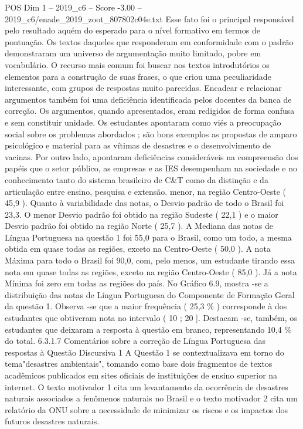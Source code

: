 \begin{textsample}{POS Dim 1 – 2019\_c6 – Score -3.00 – 2019\_c6/enade\_2019\_zoot\_807802c04e.txt}
Esse fato foi o principal responsável pelo resultado aquém do esperado para o nível formativo em termos de pontuação.
Os textos daqueles que responderam em conformidade com o padrão demonstraram um universo de argumentação muito limitado, pobre em vocabulário.
O recurso mais comum foi buscar nos textos introdutórios os elementos para a construção de suas frases, o que criou uma peculiaridade interessante, com grupos de respostas muito parecidas.
Encadear e relacionar argumentos também foi uma deficiência identificada pelos docentes da banca de correção.
Os argumentos, quando apresentados, eram redigidos de forma confusa e sem constituir unidade.
Os estudantes apontaram como viés a preocupação social sobre os problemas abordados ; são bons exemplos as propostas de amparo psicológico e material para as vítimas de desastres e o desenvolvimento de vacinas.
Por outro lado, apontaram deficiências consideráveis na compreensão dos papéis que o setor público, as empresas e as IES desempenham na sociedade e no conhecimento tanto do sistema brasileiro de C\&T como da distinção e da articulação entre ensino, pesquisa e extensão. menor, na região Centro-Oeste ( 45,9 ).
Quanto à variabilidade das notas, o Desvio padrão de todo o Brasil foi 23,3.
O menor Desvio padrão foi obtido na região Sudeste ( 22,1 ) e o maior Desvio padrão foi obtido na região Norte ( 25,7 ).
A Mediana das notas de Língua Portuguesa na questão 1 foi 55,0 para o Brasil, como um todo, a mesma obtida em quase todas as regiões, exceto na Centro-Oeste ( 50,0 ).
A nota Máxima para todo o Brasil foi 90,0, com, pelo menos, um estudante tirando essa nota em quase todas as regiões, exceto na região Centro-Oeste ( 85,0 ).
Já a nota Mínima foi zero em todas as regiões do país.
No Gráfico 6.9, mostra -se a distribuição das notas de Língua Portuguesa do Componente de Formação Geral da questão 1.
Observa -se que a maior frequência ( 25,3 \% ) corresponde à dos estudantes que obtiveram nota no intervalo ( 10 ; 20 ].
Destacam -se, também, os estudantes que deixaram a resposta à questão em branco, representando 10,4 \% do total. 6.3.1.7 Comentários sobre a correção de Língua Portuguesa das respostas à Questão Discursiva 1 A Questão 1 se contextualizava em torno do tema"desastres ambientais", tomando como base dois fragmentos de textos acadêmicos publicados em sites oficiais de instituições de ensino superior na internet.
O texto motivador 1 cita um levantamento da ocorrência de desastres naturais associados a fenômenos naturais no Brasil e o texto motivador 2 cita um relatório da ONU sobre a necessidade de minimizar os riscos e os impactos dos futuros desastres naturais.

\end{textsample}
